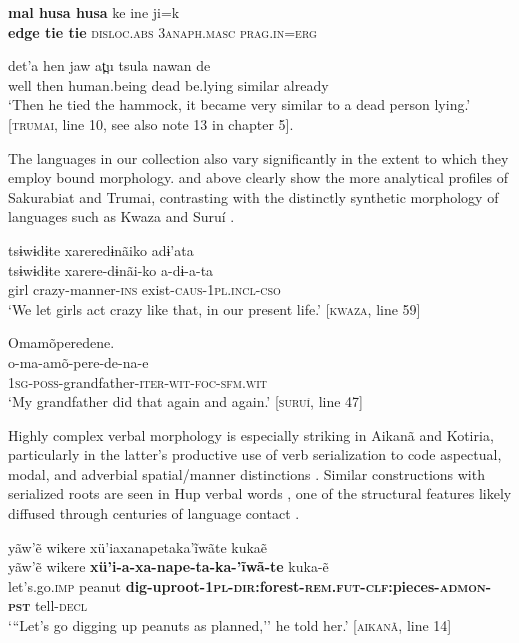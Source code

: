 \documentclass[output=paper,
modfonts,nonflat
]{langsci/langscibook}
\begin{document}
\hfill

\gll \textbf{mal husa husa} ke ine ji=k\\
\textbf{edge   tie       tie}       \textsc{disloc.abs} \textsc{3anaph.masc}  \textsc{prag.in}=\textsc{erg}\\

\hfill

\gll det'a   hen    jaw  at̪u  tsula  nawan  de\\
well  then  human.being  dead  be.lying   similar  already\\
\glt ‘Then he tied the hammock, it became very similar to a dead person lying.' [\textsc{trumai}, line 10, see also note 13 in chapter 5].
\z

    The languages in our collection also vary significantly in the extent to which they employ bound morphology.  and  above clearly show the more analytical profiles of Sakurabiat and Trumai, contrasting with the distinctly synthetic morphology of languages such as Kwaza  and Suruí . 

\ea\label{ex:intro:21} tsɨwɨdɨte xareredɨnãiko adɨ'ata\\[.3em]
\gll tsɨwɨdɨte	xarere-dɨnãi-ko	a-dɨ-a-ta\\
girl			crazy-manner-\textsc{ins}	exist-\textsc{caus-1pl.incl-cso}\\
\glt ‘We let girls act crazy like that, in our present life.’ [\textsc{kwaza}, line 59]
\z

\ea\label{ex:intro:22} Omamõperedene.\\[.3em]
\gll o-ma-amõ-pere-de-na-e\\
\textsc{1sg-poss}-grandfather-\textsc{iter-wit-foc-sfm.wit}\\
\glt ‘My grandfather did that again and again.’ [\textsc{suruí}, line 47]\\
\z

Highly complex verbal morphology is especially striking in Aikanã  and Kotiria, particularly in the latter's productive use of verb serialization to code aspectual, modal, and adverbial spatial/manner distinctions . Similar constructions with serialized roots are seen in Hup verbal words , one of the structural features likely diffused through centuries of language contact \citep{Epps2007}.

\ea\label{ex:intro:23}   yãw'ẽ wikere xü'iaxanapetaka'ĩwãte kukaẽ \\[.3em]
\gll yãw'ẽ wikere \textbf{xü'i-a-xa-nape-ta-ka-'ĩwã-te} kuka-ẽ\\
    let's.go.\textsc{imp} peanut \textbf{dig-uproot-\textsc{1pl-dir:}forest-\textsc{rem.fut}-\textsc{clf}:pieces-\textsc{admon-pst}} tell-\textsc{decl}\\
\glt    `{``}Let's go digging up peanuts as planned,'' he told her.' [\textsc{aikanã}, line 14]\\
\z
\end{document}
